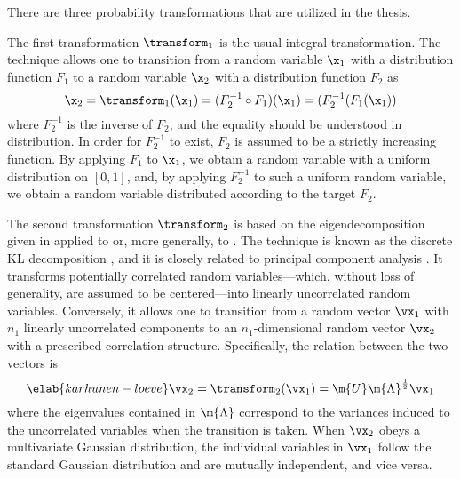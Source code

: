 There are three probability transformations that are utilized in the thesis.

The first transformation $\transform_1$ is the usual integral transformation.
The technique allows one to transition from a random variable $\x_1$ with a
distribution function $F_1$ to a random variable $\x_2$ with a distribution
function $F_2$ as
\[
  \x_2 = \transform_1(\x_1) = (F_2^{-1} \circ F_1)(\x_1) = (F_2^{-1}(F_1(\x_1))
\]
where $F_2^{-1}$ is the inverse of $F_2$, and the equality should be understood
in distribution. In order for $F_2^{-1}$ to exist, $F_2$ is assumed to be a
strictly increasing function. By applying $F_1$ to $\x_1$, we obtain a random
variable with a uniform distribution on $[0, 1]$, and, by applying $F_2^{-1}$ to
such a uniform random variable, we obtain a random variable distributed
according to the target $F_2$.

The second transformation $\transform_2$ is based on the eigendecomposition
given in  applied to  or, more
generally, to . The technique is known as the discrete
\ac{KL} decomposition \cite{ghanem1991, xiu2010}, and it is closely related to
principal component analysis \cite{hastie2013}. It transforms potentially
correlated random variables---which, without loss of generality, are assumed to
be centered---into linearly uncorrelated random variables. Conversely, it allows
one to transition from a random vector $\vx_1$ with $n_1$ linearly uncorrelated
components to an $n_1$-dimensional random vector $\vx_2$ with a prescribed
correlation structure. Specifically, the relation between the two vectors is
\begin{equation} \elab{karhunen-loeve}
  \vx_2 = \transform_2(\vx_1) = \m{U} \m{\Lambda}^\frac{1}{2} \vx_1
\end{equation}
where the eigenvalues contained in $\m{\Lambda}$ correspond to the variances
induced to the uncorrelated variables when the transition is taken. When $\vx_2$
obeys a multivariate Gaussian distribution, the individual variables in $\vx_1$
follow the standard Gaussian distribution and are mutually independent, and vice
versa.

